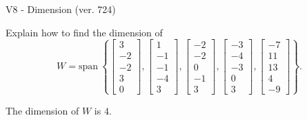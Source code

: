 \begin{exercise}
  \begin{exerciseTitle}V8 - Dimension (ver. 724)\end{exerciseTitle}
  \begin{exerciseStatement}
    Explain how to find the dimension of 
\[W=\mathrm{span}\ \left\{\left[\begin{array}{r}
3 \\
-2 \\
-2 \\
3 \\
0
\end{array}\right] , \left[\begin{array}{r}
1 \\
-1 \\
-1 \\
-4 \\
3
\end{array}\right] , \left[\begin{array}{r}
-2 \\
-2 \\
0 \\
-1 \\
3
\end{array}\right] , \left[\begin{array}{r}
-3 \\
-4 \\
-3 \\
0 \\
3
\end{array}\right] , \left[\begin{array}{r}
-7 \\
11 \\
13 \\
4 \\
-9
\end{array}\right]\right\}.\]



  \end{exerciseStatement}
  \begin{exerciseAnswer}
   The dimension of \(W\) is  \(4\).
  


  \end{exerciseAnswer}
\end{exercise}